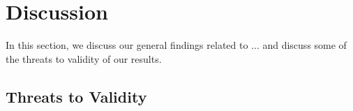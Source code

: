 \section{Discussion}

In this section, we discuss our general findings related to ... and discuss some of the threats to validity of our results.



\subsection{Threats to Validity}


